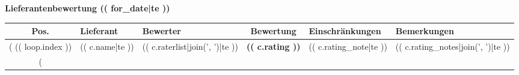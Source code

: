 \documentclass[a4paper,paper=landscape]{scrartcl}
\begin{document}
\sffamily

\begin{center}
\textbf{Lieferantenbewertung (( for_date|te ))}

{
\small
\begin{longtable}{|c|p{6cm}|p{6cm}|c|p{4cm}|p{4cm}|}
\hline
Pos. & Lieferant & Bewerter & Bewertung & Einschränkungen & Bemerkungen\\
\hline
(%
(( loop.index )) & (( c.name|te )) & (( c.raterlist|join(', ')|te )) & \cellcolor{(( c.rating ))}\textbf{(( c.rating ))} & (( c.rating_note|te )) & (( c.rating_notes|join(', ')|te ))\\
\hline
(%
\end{longtable}
}

\end{center}
\end{document}
